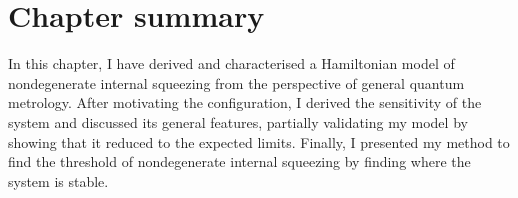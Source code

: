 


\section{Chapter summary}

In this chapter, I have derived and characterised a Hamiltonian model of nondegenerate internal squeezing from the perspective of general quantum metrology.
After motivating the configuration, I derived the sensitivity of the system and discussed its general features, partially validating my model by showing that it reduced to the expected limits. Finally, I presented my method to find the threshold of nondegenerate internal squeezing by finding where the system is stable. %



